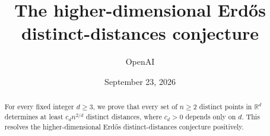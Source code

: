 \documentclass[11pt]{article}
\title{The higher-dimensional Erd\H{o}s distinct-distances conjecture}
\author{OpenAI}
\date{September 23, 2026}
\begin{document}
\maketitle
\begin{abstract}
For every fixed integer $d\ge3$, we prove that every set of $n\ge2$ distinct
points in $\mathbb R^d$ determines at least $c_d n^{2/d}$ distinct
distances, where $c_d>0$ depends only on $d$. This resolves the
higher-dimensional Erd\H{o}s distinct-distances conjecture positively.
\end{abstract}

\FloatBarrier
\tableofcontents






\appendix




\end{document}
